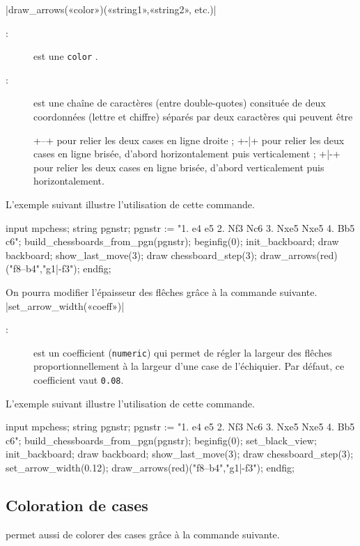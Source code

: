 \documentclass[french]{ltxdoc}
\begin{document}
\commande|draw_arrows(«color»)(«string1»,«string2», etc.)|\smallskip
\begin{description}
\item[:] est une \lstinline+color+ \MP.
\item[:] est une chaîne de caractères (entre double-quotes) consituée de deux coordonnées (lettre et chiffre) séparés par deux caractères qui peuvent être
\begin{description}
\vitem+--+ pour relier les deux cases en ligne droite ;
\vitem+-|+ pour relier les deux cases en ligne brisée, d’abord horizontalement puis verticalement ;
\vitem+|-+ pour relier les deux cases en ligne brisée, d’abord verticalement puis horizontalement.
\end{description}
\end{description}

L’exemple suivant illustre l’utilisation de cette commande.
\begin{ExempleMP}
input mpchess;
string pgnstr;
pgnstr := "1. e4 e5 2. Nf3 Nc6 3. Nxe5 Nxe5 4. Bb5 c6";
build_chessboards_from_pgn(pgnstr);
beginfig(0);
init_backboard;
draw backboard;
show_last_move(3);
draw chessboard_step(3); %
draw_arrows(red)("f8--b4","g1|-f3");
endfig;
\end{ExempleMP}

On pourra modifier l’épaisseur des flêches grâce à la commande suivante.
\commande|set_arrow_width(«coeff»)|\smallskip

\begin{description}
  \item[:] est un coefficient (\lstinline+numeric+) qui permet de
  régler la largeur des flêches proportionnellement à la largeur d’une case de
  l’échiquier. Par défaut, ce coefficient vaut \lstinline+0.08+.
\end{description}

L’exemple suivant illustre l’utilisation de cette commande.
\begin{ExempleMP}
input mpchess;
string pgnstr;
pgnstr := "1. e4 e5 2. Nf3 Nc6 3. Nxe5 Nxe5 4. Bb5 c6";
build_chessboards_from_pgn(pgnstr);
beginfig(0);
set_black_view;
init_backboard;
draw backboard;
show_last_move(3);
draw chessboard_step(3); %
set_arrow_width(0.12);
draw_arrows(red)("f8--b4","g1|-f3");
endfig;
\end{ExempleMP}


\subsection{Coloration de cases}
\mpchess permet aussi de colorer des cases grâce à la commande suivante.
\end{document}
